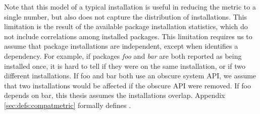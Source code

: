 \vspace{10pt}
Note that this model of a typical installation is useful in reducing the metric to a single number,
but also does not capture the distribution of installations.
This limitation is the result of the available package installation statistics,
which do not include correlations among installed packages.
This limitation requires us to 
assume that package installations are independent,
except when \osinstaller{} identifies a dependency.
For example, if packages {\em foo} and {\em bar} are both reported as being installed once,
it is hard to tell if they were on the same installation, or if two different installations.
If foo and bar both use an obscure system API, we assume that two installations would be affected if the obscure API were removed.
If foo depends on bar, this thesis assumes the installations overlap. %
Appendix \ref{sec:defs:compatmetric} formally defines \compatmetric{}.



 
 

